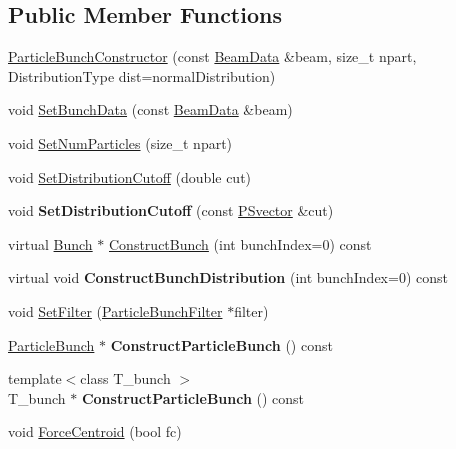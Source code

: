 \subsection*{Public Member Functions}
\begin{DoxyCompactItemize}
\item 
\hyperlink{classParticleTracking_1_1ParticleBunchConstructor_a645edb6f56ea4bfb61ad75185a924050}{Particle\+Bunch\+Constructor} (const \hyperlink{classBeamData}{Beam\+Data} \&beam, size\+\_\+t npart, Distribution\+Type dist=normal\+Distribution)
\item 
void \hyperlink{classParticleTracking_1_1ParticleBunchConstructor_a1ac0c6a860f9c965024ae98cdfad3061}{Set\+Bunch\+Data} (const \hyperlink{classBeamData}{Beam\+Data} \&beam)
\item 
void \hyperlink{classParticleTracking_1_1ParticleBunchConstructor_af9b173eff7bf38dd184d57b4cfc79eae}{Set\+Num\+Particles} (size\+\_\+t npart)
\item 
void \hyperlink{classParticleTracking_1_1ParticleBunchConstructor_ace6c25b2b60441f1741fb501f654c819}{Set\+Distribution\+Cutoff} (double cut)
\item 
\mbox{\label{classParticleTracking_1_1ParticleBunchConstructor_af124f82efd7a7d29040ae8d5475c69f4}} 
void {\bfseries Set\+Distribution\+Cutoff} (const \hyperlink{classPSvector}{P\+Svector} \&cut)
\item 
virtual \hyperlink{classBunch}{Bunch} $\ast$ \hyperlink{classParticleTracking_1_1ParticleBunchConstructor_aebe4d8d199000312012024ff73b71ec2}{Construct\+Bunch} (int bunch\+Index=0) const
\item 
\mbox{\label{classParticleTracking_1_1ParticleBunchConstructor_a7e550890fd24f43cf0f6c31bd0e26842}} 
virtual void {\bfseries Construct\+Bunch\+Distribution} (int bunch\+Index=0) const
\item 
void \hyperlink{classParticleTracking_1_1ParticleBunchConstructor_acbdb3fe8570599749338fc443899c581}{Set\+Filter} (\hyperlink{classParticleTracking_1_1ParticleBunchFilter}{Particle\+Bunch\+Filter} $\ast$filter)
\item 
\mbox{\label{classParticleTracking_1_1ParticleBunchConstructor_aed1147c53a487f0118092f70872adffc}} 
\hyperlink{classParticleTracking_1_1ParticleBunch}{Particle\+Bunch} $\ast$ {\bfseries Construct\+Particle\+Bunch} () const
\item 
\mbox{\label{classParticleTracking_1_1ParticleBunchConstructor_a0aa5f93ba98296e883f0c968869ce748}} 
{\footnotesize template$<$class T\+\_\+bunch $>$ }\\T\+\_\+bunch $\ast$ {\bfseries Construct\+Particle\+Bunch} () const
\item 
void \hyperlink{classParticleTracking_1_1ParticleBunchConstructor_ab451ce643161911314a6d72ad564467d}{Force\+Centroid} (bool fc)
\end{DoxyCompactItemize}


